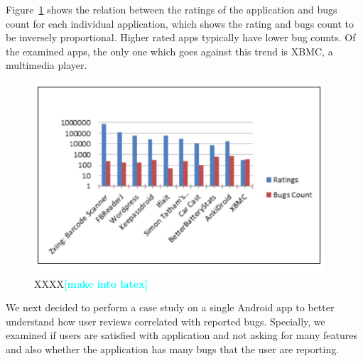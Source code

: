 \documentclass{sig-alternate}
\newcommand{\todo}[1]{\textcolor{cyan}{\textbf{[#1]}}}
\begin{document}
Figure~\ref{fig:userRatings} shows the relation between the ratings of the application and bugs count for each individual application, which shows the rating and bugs count to be inversely proportional. Higher rated apps typically have lower bug counts. Of the examined apps, the only one which goes against this trend is XBMC, a multimedia player. 



\begin{figure}[ht!]
\centering
\includegraphics[width=\columnwidth, angle = 0]{images/c1.png}
\caption{XXXX\todo{make into latex}}
\label{fig:userRatings}
\end{figure}




We next decided to perform a case study on a single Android app to better understand how user reviews correlated with reported bugs. Specially, we examined if users are satisfied with application and not asking for many features and also whether the application has many bugs that the user are reporting.
\end{document}
